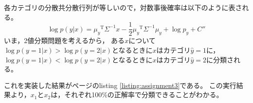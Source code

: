 \documentclass[class=jsarticle, crop=false, dvipdfmx, fleqn]{standalone}
\begin{document}
\section{}


各カテゴリの分散共分散行列が等しいので，対数事後確率は以下のように表される。
\begin{equation}
	\log p(y|x) = {\mu_y}^\mathrm{T} \Sigma^{-1} x - \frac{1}{2} {\mu_y}^\mathrm{T} \Sigma^{-1} \mu_y + \log p_y + C''
\end{equation}
いま，2値分類問題を考えるから，
ある\(x\)について\(\log p(y=1|x) > \log p(y=2|x)\)となるときに\(x\)はカテゴリ\(\hat{y}=1\)に，
\(\log p(y=1|x) < \log p(y=2|x)\)となるときに\(x\)はカテゴリ\(\hat{y}=2\)に分類される。

これを実装した結果が\pageref{listing:assignment3}ページのlisting \ref{listing:assignment3}である。
この実行結果より，\(x_1\)と\(x_2\)は，それぞれ100{\%}の正解率で分類できることがわかる。
\end{document}
